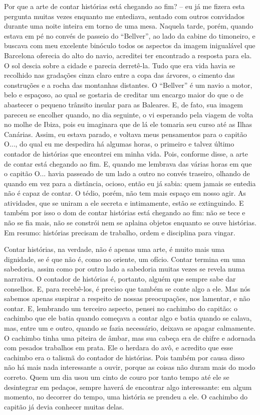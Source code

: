 Por que a arte de contar histórias está chegando ao fim? -- eu já me
fizera esta pergunta muitas vezes enquanto me entediava, sentado com
outros convidados durante uma noite inteira em torno de uma mesa.
Naquela tarde, porém, quando estava em pé no convés de passeio do
``Bellver'', ao lado da cabine do timoneiro, e buscava com meu excelente
binóculo todos os aspectos da imagem inigualável que Barcelona oferecia
do alto do navio, acreditei ter encontrado a resposta para ela. O sol
descia sobre a cidade e parecia derretê-la. Tudo que era vida havia se
recolhido nas gradações cinza claro entre a copa das árvores, o cimento
das construções e a rocha das montanhas distantes. O ``Bellver'' é um
navio a motor, belo e espaçoso, ao qual se gostaria de creditar um
encargo maior do que o de abastecer o pequeno trânsito insular para as
Baleares. E, de fato, sua imagem pareceu se encolher quando, no dia
seguinte, o vi esperando pela viagem de volta no molhe de Ibiza, pois eu
imaginara que de lá ele tomaria seu curso até as Ilhas Canárias. Assim,
eu estava parado, e voltava meus pensamentos para o capitão O..., do
qual eu me despedira há algumas horas, o primeiro e talvez último
contador de histórias que encontrei em minha vida. Pois, conforme disse,
a arte de contar está chegando ao fim. E, quando me lembrava das várias
horas em que o capitão O... havia passeado de um lado a outro no convés
traseiro, olhando de quando em vez para a distância, ocioso, então eu já
sabia: quem jamais se entedia não é capaz de contar. O tédio, porém, não
tem mais espaço em nosso agir. As atividades, que se uniram a ele
secreta e intimamente, estão se extinguindo. E também por isso o dom de
contar histórias está chegando ao fim: não se tece e não se fia mais,
não se constrói nem se aplaina objetos enquanto se ouve histórias. Em
resumo: histórias precisam de trabalho, ordem e disciplina para vingar.

Contar histórias, na verdade, não é apenas uma arte, é muito mais uma
dignidade, se é que não é, como no oriente, um ofício. Contar termina em
uma sabedoria, assim como por outro lado a sabedoria muitas vezes se
revela numa narrativa. O contador de histórias é, portanto, alguém que
sempre sabe dar conselhos. E, para recebê-los, é preciso que também se
conte algo a ele. Mas nós sabemos apenas suspirar a respeito de nossas
preocupações, nos lamentar, e não contar. E, lembrando um terceiro
aspecto, pensei no cachimbo do capitão: o cachimbo que ele batia quando
começava a contar algo e batia quando se calava, mas, entre um e outro,
quando se fazia necessário, deixava se apagar calmamente. O cachimbo
tinha uma piteira de âmbar, mas sua cabeça era de chifre e adornada com
pesados trabalhos em prata. Ele o herdara do avô, e acredito que esse
cachimbo era o talismã do contador de histórias. Pois também por causa
disso não há mais nada interessante a ouvir, porque as coisas não duram
mais do modo correto. Quem um dia usou um cinto de couro por tanto tempo
até ele se desintegrar em pedaços, sempre haverá de encontrar algo
interessante: em algum momento, no decorrer do tempo, uma história se
prendeu a ele. O cachimbo do capitão já devia conhecer muitas delas.

